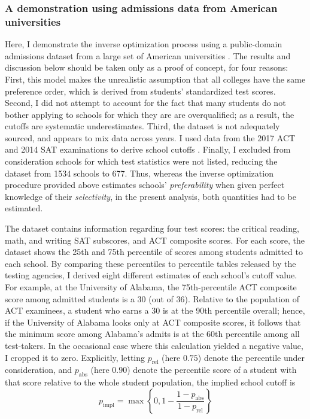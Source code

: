 \documentclass[12pt]{article}
\numberwithin{equation}{subsection}
\theoremstyle{definition}
\begin{document}
\subsubsection{A demonstration using admissions data from American universities}
Here, I demonstrate the inverse optimization process using a public-domain admissions dataset from a large set of American universities \parencite[][]{collegeadmissionskaggle}. The results and discussion below should be taken only as a proof of concept, for four reasons: First, this model makes the unrealistic assumption that all colleges have the same preference order, which is derived from students' standardized test scores. Second, I did not attempt to account for the fact that many students do not bother applying to schools for which they are are overqualified; as a result, the cutoffs are systematic underestimates. Third, the dataset is not adequately sourced, and appears to mix data across years. I used data from the 2017 ACT and 2014 SAT examinations to derive school cutoffs \parencite[][]{ACTprofilerpt, SATpercentileranks}. Finally, I excluded from consideration schools for which test statistics were not listed, reducing the dataset from 1534 schools to 677. Thus, whereas the inverse optimization procedure provided above estimates schools' \emph{preferability} when given perfect knowledge of their \emph{selectivity}, in the present analysis, both quantities had to be estimated.

The dataset contains information regarding four test scores: the critical reading, math, and writing SAT subscores, and ACT composite scores. For each score, the dataset shows the 25th and 75th percentile of scores among students admitted to each school. By comparing these percentiles to percentile tables released by the testing agencies, I derived eight different estimates of each school's cutoff value. For example, at the University of Alabama, the 75th-percentile ACT composite score among admitted students is a 30 (out of 36). Relative to the population of ACT examinees, a student who earns a 30 is at the 90th percentile overall; hence, if the University of Alabama looks only at ACT composite scores, it follows that the minimum score among Alabama's admits is at the 60th percentile among all test-takers. In the occasional case where this calculation yielded a negative value, I cropped it to zero. Explicitly, letting $p_{\text{rel}}$ (here $0.75$) denote the percentile under consideration, and $p_{\text{abs}}$ (here $0.90$) denote the percentile score of a student with that score relative to the whole student population, the implied school cutoff is \[p_{\text{impl}} = \max\left\{0, 1 - \frac{1 - p_{\text{abs}}}{1- p_{\text{rel}}}\right\}\]
\end{document}
